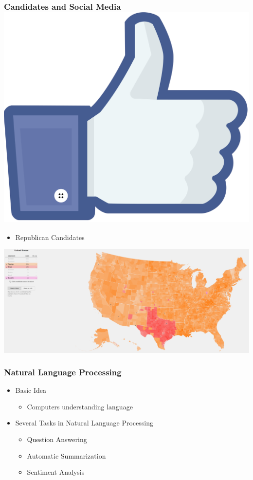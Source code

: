 \documentclass[xcolor=dvipsnames]{beamer}
\begin{document}
\begin{frame}
\frametitle{Candidates and Social Media  \hfill  \includegraphics[scale=.015]{images/likes.png}}

\begin{itemize}
\item Republican Candidates 
\end{itemize}
\begin{center}

\includegraphics[scale=.14]{repmap.png}
\end{center}
\end{frame}


\begin{frame}
\frametitle{Natural Language Processing}
	\begin{itemize}
		\item Basic Idea
		\begin{itemize}
			\item Computers understanding language
		\end{itemize}
		\pause
		\item Several Tasks in Natural Language Processing
		\begin{itemize}
			\item Question Answering
			\item Automatic Summarization
			\item Sentiment Analysis
		\end{itemize}
	\end{itemize}
\end{frame}
\end{document}
